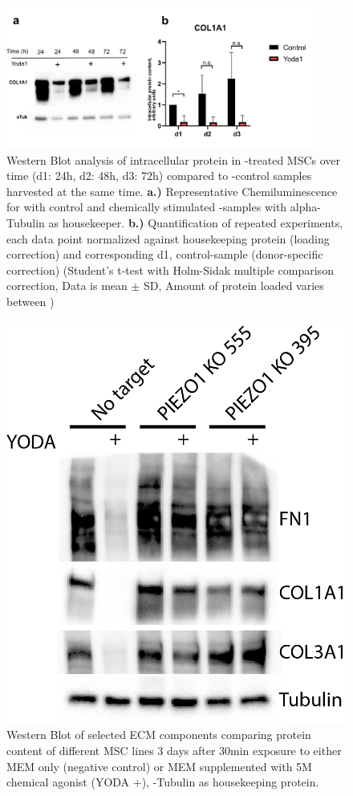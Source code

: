 \begin{figure}[htbp]
	\centering
	\includegraphics[width = 0.9\textwidth]{NormalYodaExp_WesternBlot_Col1a1.png}
	\caption{ Western Blot analysis of intracellular protein in \Yoda{}-treated MSCs over time (d1: 24h, d2: 48h, d3: 72h) compared to \Yoda{}-control samples harvested at the same time.
		\textbf{a.)} Representative Chemiluminescence for \colone with control and chemically stimulated \Piezo{}-samples with alpha-Tubulin as housekeeper.
		\textbf{b.)} Quantification of repeated experiments, each data point normalized against housekeeping protein (loading correction) and corresponding d1, control-sample (donor-specific correction) (Student's t-test with Holm-Sidak multiple comparison correction, Data is mean $\pm$ SD, Amount of protein loaded varies between )}
	\label{fig:Yoda_Norm_WB}
\end{figure}


\begin{figure}
	\centering
	\includegraphics[width=0.7\linewidth]{Uli_Blot_KO.png}
	\caption{Western Blot of selected ECM components comparing protein content of different MSC lines 3 days after 30min exposure to either MEM\textalpha{} only (negative control) or MEM\textalpha{} supplemented with 5\textmu{}M chemical \Piezo{} agonist (YODA +), \textalpha{}-Tubulin as housekeeping protein.}
	\label{pic:UliBlot}
\end{figure}

